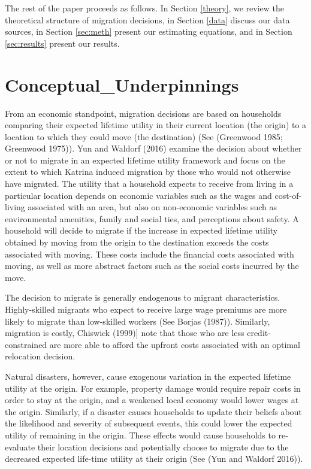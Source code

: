 \documentclass[]{article}
\begin{document}
The rest of the paper proceeds as follows. In Section \ref{theory}, we
review the theoretical structure of migration decisions, in Section
\ref{data} discuss our data sources, in Section \ref{sec:meth} present
our estimating equations, and in Section \ref{sec:results} present our
results.

\section{\texorpdfstring{Conceptual\_Underpinnings
\label{theory}}{Conceptual\_Underpinnings }}\label{conceptual_underpinnings}

From an economic standpoint, migration decisions are based on households
comparing their expected lifetime utility in their current location (the
origin) to a location to which they could move (the destination) (See
(Greenwood 1985; Greenwood 1975)). Yun and Waldorf (2016) examine the
decision about whether or not to migrate in an expected lifetime utility
framework and focus on the extent to which Katrina induced migration by
those who would not otherwise have migrated. The utility that a
household expects to receive from living in a particular location
depends on economic variables such as the wages and cost-of-living
associated with an area, but also on non-economic variables such as
environmental amenities, family and social ties, and perceptions about
safety. A household will decide to migrate if the increase in expected
lifetime utility obtained by moving from the origin to the destination
exceeds the costs associated with moving. These costs include the
financial costs associated with moving, as well as more abstract factors
such as the social costs incurred by the move.

The decision to migrate is generally endogenous to migrant
characteristics. Highly-skilled migrants who expect to receive large
wage premiums are more likely to migrate than low-skilled workers (See
Borjas (1987)). Similarly, migration is costly, Chiswick (1999){]} note
that those who are less credit-constrained are more able to afford the
upfront costs associated with an optimal relocation decision.

Natural disasters, however, cause exogenous variation in the expected
lifetime utility at the origin. For example, property damage would
require repair costs in order to stay at the origin, and a weakened
local economy would lower wages at the origin. Similarly, if a disaster
causes households to update their beliefs about the likelihood and
severity of subsequent events, this could lower the expected utility of
remaining in the origin. These effects would cause households to
re-evaluate their location decisions and potentially choose to migrate
due to the decreased expected life-time utility at their origin (See
(Yun and Waldorf 2016)).
\end{document}
